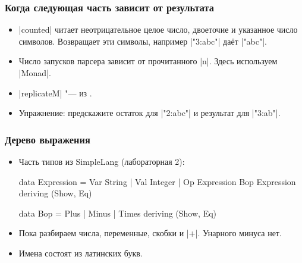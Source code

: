\documentclass[11pt]{beamer}
\begin{document}
\begin{frame}[fragile]
  \frametitle{Когда следующая часть зависит от результата}
  \begin{itemize}
    \item \haskinline|counted| читает неотрицательное целое число, двоеточие и указанное число символов. Возвращает эти символы, например \haskinline|"3:abc"| даёт \haskinline|"abc"|.
      \pause
      \pause
    \item Число запусков парсера зависит от прочитанного \haskinline|n|. Здесь используем \haskinline|Monad|.
    \item \haskinline|replicateM| "--- из \href{https://hackage.haskell.org/package/base/docs/Control-Monad.html}{}.
    \item Упражнение: предскажите остаток для \haskinline|"2:abc"| и результат для \haskinline|"3:ab"|.
  \end{itemize}
\end{frame}

\begin{frame}[fragile]
  \frametitle{Дерево выражения}
  \begin{itemize}
    \item Часть типов из SimpleLang (лабораторная 2):
      \begin{haskell}
        data Expression
          = Var String
          | Val Integer
          | Op Expression Bop Expression
          deriving (Show, Eq)

        data Bop = Plus | Minus | Times
          deriving (Show, Eq)
      \end{haskell}
    \item Пока разбираем числа, переменные, скобки и \haskinline|+|. Унарного минуса нет.
    \item Имена состоят из латинских букв.
  \end{itemize}
\end{frame}
\end{document}
